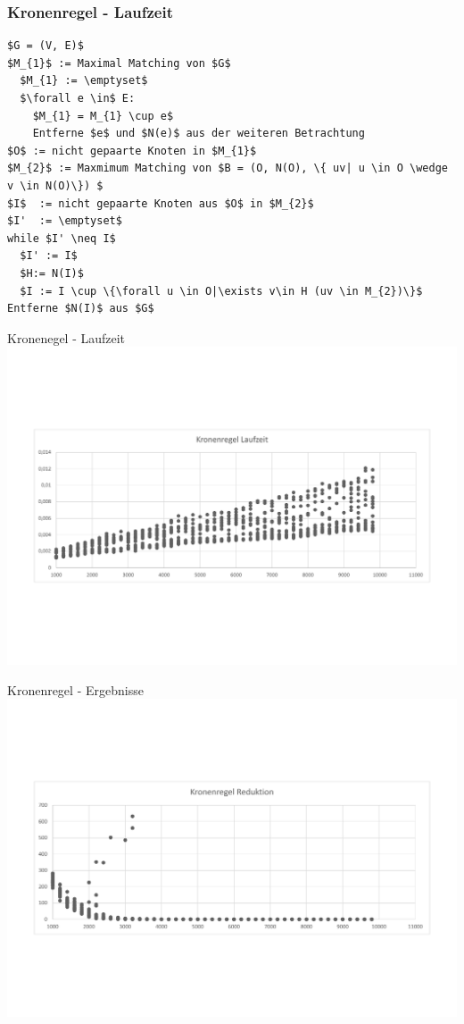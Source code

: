 \documentclass{beamer}
\begin{document}
\begin{frame}[fragile]
\frametitle{Kronenregel - Laufzeit}
\begin{lstlisting}[mathescape=true, escapechar = !,basicstyle=\ttfamily\scriptsize]
$G = (V, E)$
$M_{1}$ := Maximal Matching von $G$
  $M_{1} := \emptyset$
  $\forall e \in$ E:
    $M_{1} = M_{1} \cup e$
    Entferne $e$ und $N(e)$ aus der weiteren Betrachtung
$O$ := nicht gepaarte Knoten in $M_{1}$
$M_{2}$ := Maxmimum Matching von $B = (O, N(O), \{ uv| u \in O \wedge v \in N(O)\}) $
$I$  := nicht gepaarte Knoten aus $O$ in $M_{2}$
$I'  := \emptyset$
while $I' \neq I$
  $I' := I$
  $H:= N(I)$
  $I := I \cup \{\forall u \in O|\exists v\in H (uv \in M_{2})\}$
Entferne $N(I)$ aus $G$
\end{lstlisting}


\end{frame}


\begin{frame}{Kronenegel - Laufzeit}
\includegraphics[scale= .4]{analysis1000_CrownNormal_runtime.pdf} 
\end{frame}

\begin{frame}{Kronenregel - Ergebnisse}
\includegraphics[scale= .4]{analysisCrown.pdf} 
\end{frame}
\end{document}
